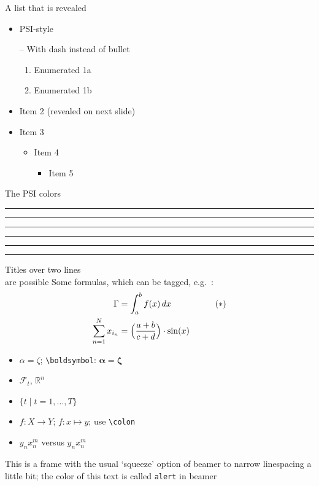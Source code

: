 \documentclass[aspectratio=169,t]{beamer}  %
\begin{document}
\begin{frame}{A list that is revealed}

  \begin{itemize}
  \item PSI-style 
  \item[--]  With dash instead of bullet
    \begin{enumerate}
    \item Enumerated 1a
    \item Enumerated 1b
    \end{enumerate}
    \pause
  \item Item 2 (revealed on next slide)
    \pause
  \item Item 3
    \begin{itemize}
    \item Item 4
      \begin{itemize}
      \item Item 5
      \end{itemize}
    \end{itemize}
  \end{itemize}

\end{frame}



\begin{frame}{The PSI colors}

\textcolor{PSIgreen}{\rule{2cm}{1cm}}
\textcolor{PSIyellow}{\rule{2cm}{1cm}}
\textcolor{PSIpink}{\rule{2cm}{1cm}}
\textcolor{PSIblue}{\rule{2cm}{1cm}}
\textcolor{PSIred}{\rule{2cm}{1cm}}
\textcolor{PSIviolet}{\rule{2cm}{1cm}}

\end{frame}

\begin{frame}[squeeze]{Titles over two lines\\ are possible}
  Some formulas, which can be tagged, e.g.\ \thetag{$\ast$}:
  \begin{align*}
    \Gamma  & = \int_a^b f(x)\,dx             && \tag{$\ast$}\\
    \sum_{n=1}^N x_{i_n} &= \Bigl(\frac{a+b}{c+d}\Bigr)\cdot \sin(x)  &&
  \end{align*}
  \begin{itemize}
  \item  $\alpha = \zeta$; \texttt{\textbackslash boldsymbol}: $\boldsymbol{\alpha} = \boldsymbol{\zeta}$ 
  \item $\mathcal{F}_t$, $\mathbb{R}^n$
  \item $\{t \mid t=1,\dots,T\}$
  \item $f\colon X\to Y$; $f\colon x\mapsto y$; use \texttt{\textbackslash colon}
  \item $y_nx_n^m$ versus $y_n^{}x_n^m$
  \end{itemize}
   \alert{This is a frame with the usual `squeeze' option of beamer to narrow linespacing a little bit; the color of this text is called \texttt{alert} in beamer}
  
\end{frame}
\end{document}
